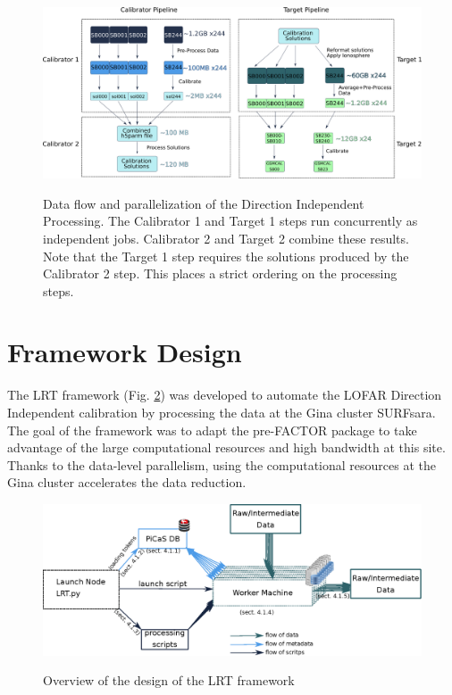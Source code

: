 \begin{figure}[H]
    \centering
 \includegraphics[width=.85\textwidth]{ch3/figures/Pipeline_parallel.eps}\\
    \caption[Parallelization of prefactor processing]{Data flow and parallelization of the Direction Independent Processing. The Calibrator 1 and Target 1 steps run concurrently as independent jobs. Calibrator 2 and Target 2 combine these results. Note that the Target 1 step requires the solutions produced by the Calibrator 2 step. This places a strict ordering on the processing steps. }
 \label{fig:ch3_DIpipe}
\end{figure}



\section{Framework Design}\label{sec:ch3_design}

The LRT framework (Fig. \ref{fig:ch3_design}) was developed to automate the LOFAR Direction Independent calibration by processing the data at the Gina cluster SURFsara\cite{gina_specs}. The goal of the framework was to adapt the pre-FACTOR package to take advantage of the large computational resources and high bandwidth at this site. Thanks to the data-level parallelism, using the computational resources at the Gina cluster accelerates the data reduction. 

\begin{figure}
 \includegraphics[width=\textwidth]{ch3/figures/design.eps}\\
 \caption{Overview of the design of the LRT framework}
 \label{fig:ch3_design}
\end{figure}

